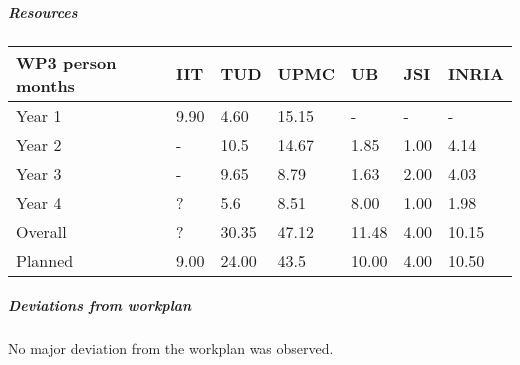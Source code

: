 
\subparagraph{Resources}

\begin{center}
\begin{tabular}{|C{1.5cm}|C{1.5cm}|C{1.5cm}|C{2cm}|C{2cm}|C{2cm}|C{2cm}|}
\hline
\footnotesize \textbf{WP3 person months} & \footnotesize \textbf{IIT}&\footnotesize \textbf{TUD}&\footnotesize \textbf{UPMC}& \footnotesize \textbf{UB} &\footnotesize \textbf{JSI} &\footnotesize \textbf{INRIA} \\ \hline
\footnotesize Year 1  &  9.90 & 4.60  & 15.15 & -    & -    &  -   \\  \hline
\footnotesize Year 2  &  -    & 10.5  & 14.67 & 1.85 & 1.00 & 4.14  \\  \hline
\footnotesize Year 3  &  -    & 9.65  & 8.79  & 1.63 & 2.00 & 4.03 \\  \hline
\footnotesize Year 4  & ?     & 5.6   & 8.51  & 8.00 & 1.00 & 1.98    \\   	\hline
\footnotesize Overall & ?     & 30.35 & 47.12 & 11.48 & 4.00 & 10.15    \\
\hline \hline
\footnotesize Planned &  9.00 & 24.00 & 43.5 & 10.00 & 4.00 & 10.50 \\ \hline
\end{tabular}
\end{center}


\subparagraph*{Deviations from workplan}

No major deviation from the workplan was observed.

